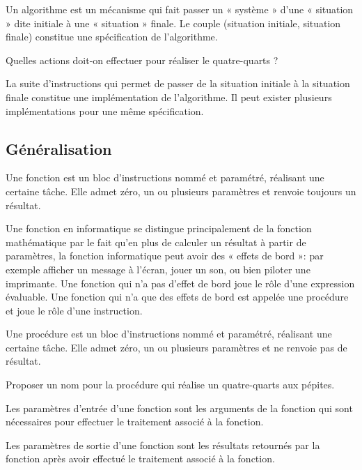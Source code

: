 Un algorithme est un mécanisme qui fait passer un « système » d'une « situation »
dite initiale à une « situation » finale. 
Le couple (situation initiale, situation finale) constitue une spécification de 
l'algorithme. 

\begin{question} 
Quelles actions doit-on effectuer pour réaliser le qua\-tre-quarts ?
\end{question}

La suite d'instructions qui permet de passer de la situation initiale à 
la situation finale constitue une implémentation de l'algorithme. 
Il peut exister plusieurs implémentations pour une même spécification.

\subsection{Généralisation}
Une fonction est un bloc d'instructions nommé et paramétré,
réalisant une certaine tâche. Elle admet zéro, un ou plusieurs 
paramètres et renvoie toujours un résultat.

Une fonction en informatique se distingue principalement de la 
fonction mathématique par le fait qu'en plus de calculer un résultat 
à partir de paramètres, la fonction informatique peut avoir des « effets de bord »: 
par exemple afficher un message à l'écran, jouer un son, 
ou bien piloter une imprimante.
Une fonction qui n'a pas d'effet de bord joue le rôle d'une expression
évaluable. Une fonction qui n'a que des effets de bord est appelée une procédure
et joue le rôle d'une instruction.

Une procédure est un bloc d'instructions nommé et paramétré,
réalisant une certaine tâche. Elle admet zéro, un ou plusieurs 
paramètres et ne renvoie pas de résultat.

\begin{question}
Proposer un nom pour la procédure qui réalise un quatre-quarts aux pépites.
\end{question}

Les paramètres d'entrée d'une fonction sont les arguments de la fonction
qui sont nécessaires pour effectuer le traitement associé à la fonction.

Les paramètres de sortie d'une fonction sont les résultats retournés 
par la fonction après avoir effectué le traitement associé à la fonction.

